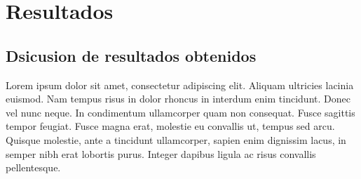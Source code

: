 
\chapter{Resultados} %

\label{Chapter5} %


\section{Dsicusion de resultados obtenidos}

Lorem ipsum dolor sit amet, consectetur adipiscing elit. Aliquam ultricies lacinia euismod. Nam tempus risus in dolor rhoncus in interdum enim tincidunt. Donec vel nunc neque. In condimentum ullamcorper quam non consequat. Fusce sagittis tempor feugiat. Fusce magna erat, molestie eu convallis ut, tempus sed arcu. Quisque molestie, ante a tincidunt ullamcorper, sapien enim dignissim lacus, in semper nibh erat lobortis purus. Integer dapibus ligula ac risus convallis pellentesque.
